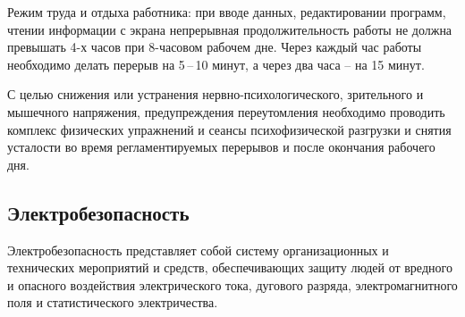Режим труда и отдыха работника: при вводе данных, редактировании программ, чтении информации с экрана непрерывная продолжительность работы не должна превышать 4-х часов при 8-часовом рабочем дне. 
Через каждый час работы необходимо делать перерыв на 5\,--\,10 минут, а через два часа -- на 15 минут.

С целью снижения или устранения нервно-психологического, зрительного и мышечного напряжения, предупреждения переутомления необходимо проводить комплекс физических упражнений и сеансы психофизической разгрузки и снятия усталости во время регламентируемых перерывов и после окончания рабочего дня.


\subsection{Электробезопасность}

Электробезопасность представляет собой систему организационных и технических мероприятий и средств, обеспечивающих защиту людей от вредного и опасного воздействия электрического тока, дугового разряда, электромагнитного поля и статистического электричества.



